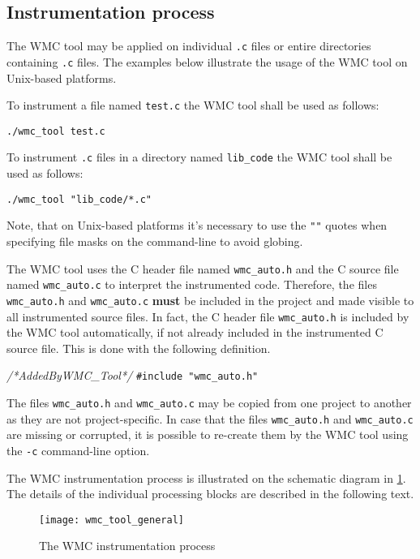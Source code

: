 \subsection{Instrumentation process}
\label{ch:instrumentation_process}

The WMC tool may be applied on individual \verb|.c| files or entire directories containing \verb|.c| files. The examples below illustrate the usage of the WMC tool on Unix-based platforms.

To instrument a file named \verb|test.c| the WMC tool shall be used as follows:

\verb|./wmc_tool test.c|

To instrument \verb|.c| files in a directory named \verb|lib_code| the WMC tool shall be used as follows:

\verb|./wmc_tool "lib_code/*.c"|

Note, that on Unix-based platforms it's necessary to use the \verb|""| quotes when specifying file masks on the command-line to avoid globing.

The WMC tool uses the C header file named \verb|wmc_auto.h| and the C source file named \verb|wmc_auto.c| to interpret the instrumented code. Therefore, the files \verb|wmc_auto.h| and \verb|wmc_auto.c| \textbf{must} be included in the project and made visible to all instrumented source files. In fact, the C header file \verb|wmc_auto.h| is included by the WMC tool automatically, if not already included in the instrumented C source file. This is done with the following definition.

{
{\em /*AddedByWMC\_Tool*/}    {\verb|#include "wmc_auto.h"|}
}

The files \verb|wmc_auto.h| and \verb|wmc_auto.c| may be copied from one project to another as they are not project-specific. In case that the files \verb|wmc_auto.h| and \verb|wmc_auto.c| are missing or corrupted, it is possible to re-create them by the WMC tool using the \verb|-c| command-line option.

The WMC instrumentation process is illustrated on the schematic diagram in \ref{fig:wmc_tool_general}. The details of the individual processing blocks are described in the following text.

\begin{figure}[!hbtp]
\begin{center}
\texttt{[image: wmc\_tool\_general]}
\end{center}
\caption{The WMC instrumentation process}
\label{fig:wmc_tool_general}
\end{figure}

